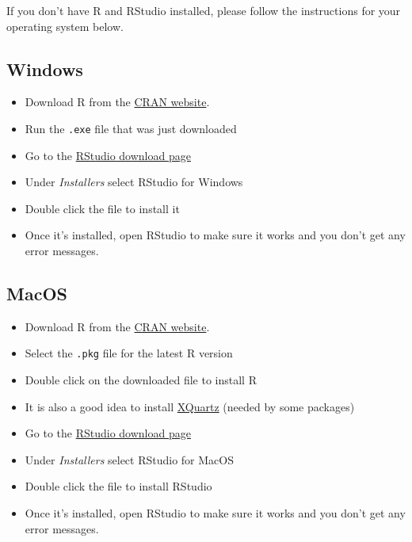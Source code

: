 \documentclass[
]{book}
\providecommand{\tightlist}{%
  \setlength{\itemsep}{0pt}\setlength{\parskip}{0pt}}
\begin{document}
If you don't have R and RStudio installed, please follow the instructions for your operating system below.

\subsection{Windows}\label{windows}

\begin{itemize}
\tightlist
\item
  Download R from
  the \href{http://cran.r-project.org/bin/windows/base/release.htm}{CRAN website}.
\item
  Run the \texttt{.exe} file that was just downloaded
\item
  Go to the \href{https://www.rstudio.com/products/rstudio/download/\#download}{RStudio download page}
\item
  Under \emph{Installers} select RStudio for Windows
\item
  Double click the file to install it
\item
  Once it's installed, open RStudio to make sure it works and you don't get any
  error messages.
\end{itemize}

\subsection{MacOS}\label{macos}

\begin{itemize}
\tightlist
\item
  Download R from
  the \href{http://cran.r-project.org/bin/macosx}{CRAN website}.
\item
  Select the \texttt{.pkg} file for the latest R version
\item
  Double click on the downloaded file to install R
\item
  It is also a good idea to install \href{https://www.xquartz.org/}{XQuartz} (needed
  by some packages)
\item
  Go to the \href{https://www.rstudio.com/products/rstudio/download/\#download}{RStudio download page}
\item
  Under \emph{Installers} select RStudio for MacOS
\item
  Double click the file to install RStudio
\item
  Once it's installed, open RStudio to make sure it works and you don't get any
  error messages.
\end{itemize}
\end{document}
